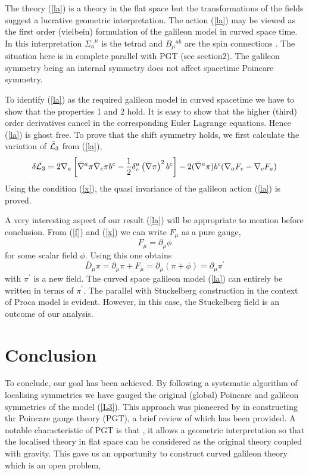 \documentclass[12pt]{article}
\begin{document}
The theory (\ref{la}) is a theory in the flat space but the transformations of the fields  
suggest a lucrative geometric interpretation. 
The action (\ref{la}) may be viewed as the first order (vielbein) formulation of the galileon model in curved space time. In this interpretation ${\Sigma_a}^\mu$ is the tetrad and $B_\mu{}^{ab}$ are the spin connections \cite{HB}. The situation here is in complete parallel with PGT (see section2). The galileon symmetry being an internal symmetry does not affect spacetime Poincare symmetry. 

 To identify (\ref{la}) as the required galileon model in curved spacetime we have to show that the properties 1 and 2 hold. It is easy to show that the higher (third) order derivatives cancel in the corresponding Euler Lagrange equations. Hence (\ref{la}) is ghost free.
To prove that the shift symmetry holds, we first calculate the variation of $\bar{\cal{L}}_3$ from (\ref{la}), 
\begin{equation}
\delta{\bar{{\cal{L}}_3}} =
2\nabla_a\left[{\bar{\nabla}
}^a\pi{\bar{\nabla}
}_c\pi b^c - \frac{1}{2}\delta_c^a\left({\bar
{\nabla}
}\pi\right)^2b^c\right]-2({\bar{\nabla}
}^a\pi)b^c(\nabla_a F_c- \nabla_c F_a)
\label{ss}
\end{equation}
Using the condition (\ref{x}), the quasi invariance of the galileon action (\ref{la}) is proved.

A very interesting aspect of our result (\ref{la}) will be appropriate to mention before conclusion. From (\ref{f}) and (\ref{x}) we can write
$F_\mu$ as a pure gauge,
 \begin{equation}
F_\mu = \partial_\mu\phi 
\end{equation}
for some scalar field $\phi$. Using this one obtains
\begin{equation}
{\bar{D}_\mu}\pi=
\partial_
\mu \pi + F_\mu =
\partial_\mu\left(\pi + \phi\right)= \partial_\mu \pi^\prime
\end{equation}
with $\pi^\prime$ is a new field. The curved space galileon model (\ref{la}) can entirely be written in terms of $\pi^\prime$. The parallel with Stuckelberg construction in the context of Proca model is evident. However, in this case, the 
Stuckelberg field is an outcome of our analysis.
\section{Conclusion}
To conclude, our goal has been achieved. By following a systematic algorithm of localising symmetries \cite{U,Kibble:1961ba,HB, Blagojevic:2002du, MMM1, MMM2, MMM3, MM4, MM5} we have gauged the original (global) Poincare and galileon symmetries of the model (\ref{L3}). This approach was pioneered by \cite{U, Kibble:1961ba} in constructing thr Poincare gauge theory (PGT), a brief review of which has been provided. A notable characteristic of PGT is that , it allows a geometric interpretation so that the 
localised theory in flat space can be considered as the original theory coupled with gravity. This gave us an opportunity to construct curved galileon theory which is an open problem,
\end{document}
